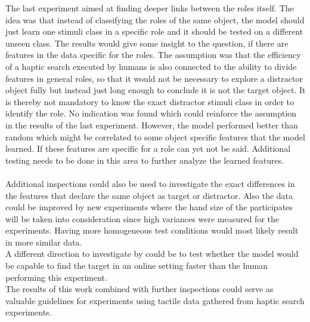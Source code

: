 The last experiment aimed at finding deeper links between the roles itself. The idea was that instead of classifying the roles of the same object, the model should just learn one stimuli class in a specific role and it should be tested on a different unseen class. The results would give some insight to the question, if there are features in the data specific for the roles. The assumption was that the efficiency of a haptic search executed by humans is also connected to the ability to divide features in general roles, so that it would not be necessary to explore a distractor object fully but instead just long enough to conclude it is not the target object. It is thereby not mandatory to know the exact distractor stimuli class in order to identify the role. No indication was found which could reinforce the assumption in the results of the last experiment. However, the model performed better than random which might be correlated to some object specific features that the model learned. If these features are specific for a role can yet not be said. Additional testing needs to be done in this area to further analyze the learned features.\\
\\

Additional inspections could also be used to investigate the exact differences in the features that declare the same object as target or distractor. Also the data could be improved by new experiments where the hand size of the participates will be taken into consideration since high variances were measured for the experiments. Having more homogeneous test conditions would most likely result in more similar data. \\
A different direction to investigate by could be to test whether the model would be capable to find the target in an online setting faster than the human performing this experiment. \\
The results of this work combined with further inspections could serve as valuable guidelines for experiments using tactile data gathered from haptic search experiments.